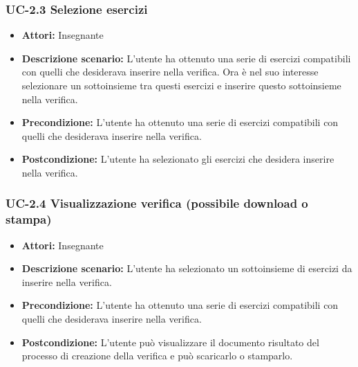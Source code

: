 \subsubsection{UC-2.3 Selezione esercizi}
\begin{itemize}
		\item \textbf{Attori: } Insegnante
		\item \textbf{Descrizione scenario: }L'utente ha ottenuto una serie di esercizi compatibili con quelli che desiderava inserire nella verifica. Ora è nel suo interesse selezionare un sottoinsieme tra questi esercizi e inserire questo sottoinsieme nella verifica.
		\item \textbf{Precondizione: }L'utente ha ottenuto una serie di esercizi compatibili con quelli che desiderava inserire nella verifica.
		\item \textbf{Postcondizione: }L'utente ha selezionato gli esercizi che desidera inserire nella verifica.
\end{itemize}
\subsubsection{UC-2.4 Visualizzazione verifica (possibile download o stampa)}
\begin{itemize}
		\item \textbf{Attori: } Insegnante
		\item \textbf{Descrizione scenario: }L'utente ha selezionato un sottoinsieme di esercizi da inserire nella verifica.
		\item \textbf{Precondizione: }L'utente ha ottenuto una serie di esercizi compatibili con quelli che desiderava inserire nella verifica.
		\item \textbf{Postcondizione: }L'utente può visualizzare il documento risultato del processo di creazione della verifica e può scaricarlo o stamparlo.
\end{itemize}